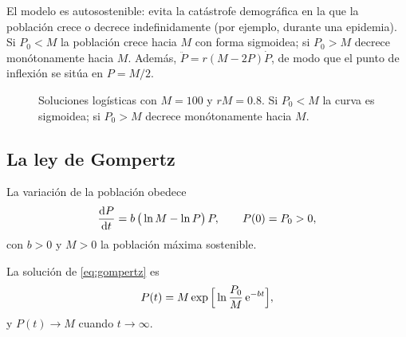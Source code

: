 \documentclass[11pt,twoside]{article}
\newcommand\leyenda[2]{\textcolor{#1}{\rule[2.2pt]{11pt}{1.1pt}}\ #2}
\begin{document}
\begin{observacion}
El modelo es autosostenible: evita la catástrofe demográfica en la que la población crece o decrece indefinidamente
(por ejemplo, durante una epidemia). Si $P_0<M$ la población crece hacia $M$ con forma sigmoidea; si $P_0>M$ decrece
monótonamente hacia $M$. Además, $\ddot P=r(M-2P)\dot P$, de modo que el punto de inflexión se sitúa en $P=M/2$.
\end{observacion}

\begin{figure}[!htbp]
\centering
{}
\caption{Soluciones logísticas con $M=100$ y $rM=0.8$. Si $P_0<M$ la curva es sigmoidea; si $P_0>M$ decrece
monótonamente hacia $M$.}
\label{fig:logistica}
\end{figure}

\subsection{La ley de Gompertz}

\begin{definicion}
La variación de la población obedece
\begin{equation}\label{eq:gompertz}
\frac{\mathrm{d}P}{\mathrm{d}t}=b\,\big(\ln M-\ln P\big)\,P,\qquad P(0)=P_0>0,
\end{equation}
con $b>0$ y $M>0$ la población máxima sostenible.
\end{definicion}

\begin{proposicion}\label{prop:gompertz}
La solución de \eqref{eq:gompertz} es
\begin{equation}\label{eq:gompertzsol}
P(t)=M\exp\Big[\ln\frac{P_0}{M}\,\mathrm{e}^{-bt}\Big],
\end{equation}
y $P(t)\to M$ cuando $t\to\infty$.
\end{proposicion}
\end{document}
